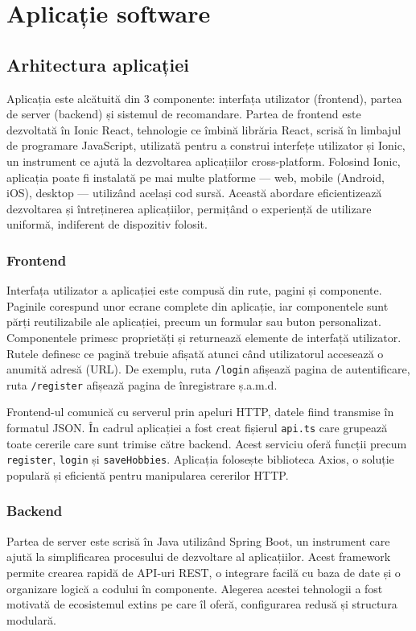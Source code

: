 \sloppy
\chapter{Aplicație software}
\label{chap:ch4}

\section{Arhitectura aplicației}
\label{sec:ch4sec1}

Aplicația este alcătuită din 3 componente: interfața utilizator (frontend), partea de server (backend) și sistemul de recomandare. 
Partea de frontend este dezvoltată în Ionic React, tehnologie ce îmbină librăria React, scrisă în limbajul de programare JavaScript, 
utilizată pentru a construi interfețe utilizator și Ionic, un instrument ce ajută la dezvoltarea aplicațiilor cross-platform. 
Folosind Ionic, aplicația poate fi instalată pe mai multe platforme --- web, mobile (Android, iOS), desktop --- utilizând același cod sursă. 
Această abordare eficientizează dezvoltarea și întreținerea aplicațiilor, permițând o experiență de utilizare uniformă, indiferent de dispozitiv folosit. 

\subsection{Frontend}
\label{subsec:ch4sec1sub1}
Interfața utilizator a aplicației este compusă din rute, pagini și componente. 
Paginile corespund unor ecrane complete din aplicație, iar componentele sunt părți reutilizabile ale aplicației, precum un formular sau buton personalizat.
Componentele primesc proprietăți și returnează elemente de interfață utilizator.
Rutele definesc ce pagină trebuie afișată atunci când utilizatorul accesează o anumită adresă (URL). 
De exemplu, ruta \texttt{/login} afișează pagina de autentificare, ruta \texttt{/register} afișează pagina de înregistrare ș.a.m.d.

\par
Frontend-ul comunică cu serverul prin apeluri HTTP, datele fiind transmise în formatul JSON.
În cadrul aplicației a fost creat fișierul \texttt{api.ts} care grupează toate cererile care sunt trimise către backend. 
Acest serviciu oferă funcții precum \texttt{register}, \texttt{login} și \texttt{saveHobbies}.
Aplicația folosește biblioteca Axios, o soluție populară și eficientă pentru manipularea cererilor HTTP.


\subsection{Backend}
\label{subsec:ch4sec1sub2}
Partea de server este scrisă în Java utilizând Spring Boot, un instrument care ajută la simplificarea procesului de dezvoltare al aplicațiilor.
Acest framework permite crearea rapidă de API-uri REST, o integrare facilă cu baza de date și o organizare logică a codului în componente. Alegerea
acestei tehnologii a fost motivată de ecosistemul extins pe care îl oferă, configurarea redusă și structura modulară. 

